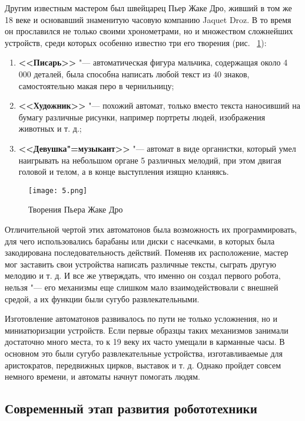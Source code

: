 \documentclass[bachelor, och, referat]{SCWorks}
\begin{document}
Другим известным мастером был швейцарец Пьер Жаке Дро, живший в том же 18 веке и
основавший знаменитую часовую компанию Jaquet Droz. В то время он прославился не
только своими хронометрами, но и множеством сложнейших устройств, среди которых
особенно известно три его творения (рис. ~\ref{fig:5}):

\begin{enumerate}
    \item \textbf{<<Писарь>>} "--- автоматическая фигура мальчика, содержащая
    около 4 000 деталей, была способна написать любой текст из 40 знаков,
    самостоятельно макая перо в чернильницу;
    \item \textbf{<<Художник>>} "--- похожий автомат, только вместо текста
    наносивший на бумагу различные рисунки, например портреты людей, изображения
    животных и т. д.;
    \item \textbf{<<Девушка"=музыкант>>} "--- автомат в виде органистки, который
    умел наигрывать на небольшом органе 5 различных мелодий, при этом двигая
    головой и телом, а в конце выступления изящно кланяясь.
\end{enumerate}

\begin{figure}[h!]
    \centering
    \texttt{[image: 5.png]}
    \caption{\label{fig:5}%
    Творения Пьера Жаке Дро}
\end{figure}

Отличительной чертой этих автоматонов была возможность их программировать, для
чего использовались барабаны или диски с насечками, в которых была закодирована
последовательность действий. Поменяв их расположение, мастер мог заставить свои
устройства написать различные тексты, сыграть другую мелодию и т. д. И все же
утверждать, что именно он создал первого робота, нельзя "--- его механизмы еще
слишком мало взаимодействовали с внешней средой, а их функции были сугубо
развлекательными.

Изготовление автоматонов развивалось по пути не только усложнения, но и
миниатюризации устройств. Если первые образцы таких механизмов занимали
достаточно много места, то к 19 веку их часто умещали в карманные часы. В
основном это были сугубо развлекательные устройства, изготавливаемые для
аристократов, передвижных цирков, выставок и т. д. Однако пройдет совсем немного
времени, и автоматы начнут помогать людям.

\subsection{Современный этап развития робототехники}
\end{document}
